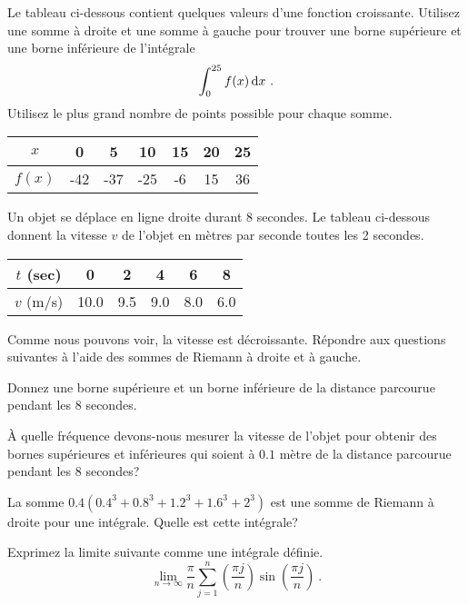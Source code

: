 \begin{question}
Le tableau ci-dessous contient quelques valeurs d'une fonction croissante.
Utilisez une somme à droite et une somme à gauche pour trouver une
borne supérieure et une borne inférieure de l'intégrale
\[
\int_0^{25} f(x) \,\mathrm{d}x \ .
\]
Utilisez le plus grand nombre de points possible pour chaque somme.
\begin{center}
\begin{tabular}{|c|c|c|c|c|c|c|}
\hline
$x$ & 0 & 5 & 10 & 15 & 20 & 25 \\
\hline
$f(x)$ & -42 & -37 & -25 & -6 & 15 & 36 \\
\hline
\end{tabular}
\end{center}
\label{7Q14}
\end{question}

\begin{question}
Un objet se déplace en ligne droite durant 8 secondes.  Le tableau
ci-dessous donnent la vitesse $v$ de l'objet en mètres par seconde
toutes les 2 secondes.
\begin{center}
\begin{tabular}{|c|c|c|c|c|c|}
\hline
$t$  (sec) & 0 & 2 & 4 & 6 & 8 \\
\hline
$v$  (m/s) & 10.0 & 9.5 & 9.0 & 8.0 & 6.0 \\
\hline
\end{tabular}
\end{center}
Comme nous pouvons voir, la vitesse est décroissante.  Répondre aux
questions suivantes à l'aide des sommes de Riemann à droite et
à gauche.

 Donnez une borne supérieure et un borne inférieure de la
distance parcourue pendant les 8 secondes.

 À quelle fréquence devons-nous mesurer la vitesse de l'objet
pour obtenir des bornes supérieures et inférieures qui soient à $0.1$
mètre de la distance parcourue pendant les 8 secondes?
\label{7Q15}
\end{question}

\begin{question}
La somme $\displaystyle 0.4 ( 0.4^3 + 0.8^3 + 1.2^3 + 1.6^3 + 2^3)$
est une somme de Riemann à droite pour une intégrale.  Quelle est
cette intégrale?
\label{7Q16}
\end{question}

\begin{question}
Exprimez la limite suivante comme une intégrale définie.
\[
\lim_{n\rightarrow \infty} \frac{\pi}{n} \sum_{j=1}^n
\left(\frac{\pi j}{n}\right) \sin\left(\frac{\pi j}{n}\right) \ .
\]
\label{7Q17}
\end{question}

